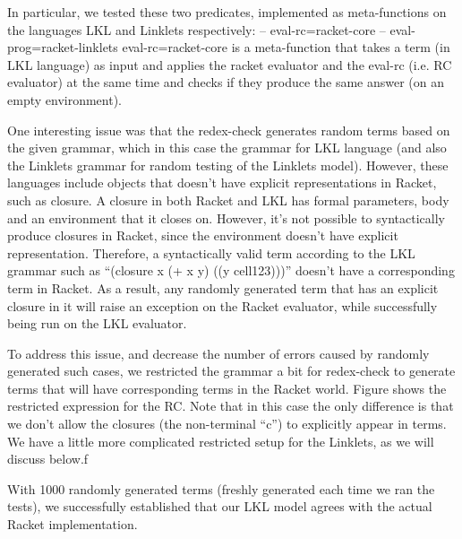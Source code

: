 			\begin{paragraph-here}%
				In particular, we tested these two predicates, implemented as meta-functions on the languages LKL and Linklets respectively: – eval-rc=racket-core – eval-prog=racket-linklets eval-rc=racket-core is a meta-function that takes a term (in LKL language) as input and applies the racket evaluator and the eval-rc (i.e. RC evaluator) at the same time and checks if they produce the same answer (on an empty environment).
			\end{paragraph-here}

			\begin{paragraph-here}%
				One interesting issue was that the redex-check generates random terms based on the given grammar, which in this case the grammar for LKL language (and also the Linklets grammar for random testing of the Linklets model). However, these languages include objects that doesn’t have explicit representations in Racket, such as closure. A closure in both Racket and LKL has formal parameters, body and an environment that it closes on. However, it’s not possible to syntactically produce closures in Racket, since the environment doesn’t have explicit representation. Therefore, a syntactically valid term according to the LKL grammar such as “(closure x (+ x y) ((y cell123)))” doesn’t have a corresponding term in Racket. As a result, any randomly generated term that has an explicit closure in it will raise an exception on the Racket evaluator, while successfully being run on the LKL evaluator.
			\end{paragraph-here}


			\begin{paragraph-here}%
				To address this issue, and decrease the number of errors caused by randomly generated such cases, we restricted the grammar a bit for redex-check to generate terms that will have corresponding terms in the Racket world. Figure shows the restricted expression for the RC. Note that in this case the only difference is that we don’t allow the closures (the non-terminal “c”) to explicitly appear in terms. We have a little more complicated restricted setup for the Linklets, as we will discuss below.f 
			\end{paragraph-here}

			\begin{paragraph-here}%
				With 1000 randomly generated terms (freshly generated each time we ran the tests), we successfully established that our LKL model agrees with the actual Racket implementation.
			\end{paragraph-here}


